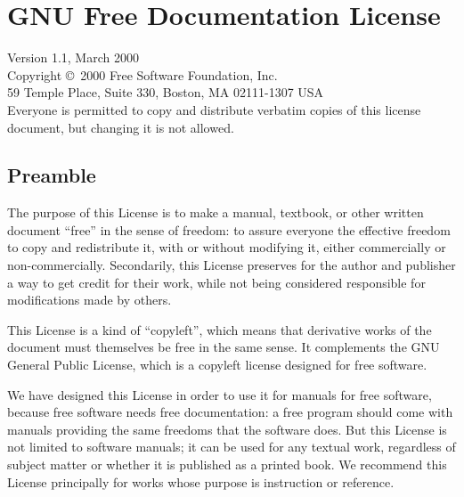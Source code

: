 \documentclass[12pt,twoside,openright,a4paper]{book}
\begin{document}
\chapter{GNU Free Documentation License}
\label{gfdl}



\begingroup
	\small

	Version 1.1, March 2000\\

	Copyright \copyright\ 2000  Free Software Foundation, Inc.\\
		59 Temple Place, Suite 330, Boston, MA  02111-1307  USA\\
	Everyone is permitted to copy and distribute verbatim copies
	of this license document, but changing it is not allowed.

	\section*{Preamble}

	The purpose of this License is to make a manual, textbook, or other
	written document ``free'' in the sense of freedom: to assure everyone
	the effective freedom to copy and redistribute it, with or without
	modifying it, either commercially or non-commercially.  Secondarily,
	this License preserves for the author and publisher a way to get
	credit for their work, while not being considered responsible for
	modifications made by others.

	This License is a kind of ``copyleft'', which means that derivative
	works of the document must themselves be free in the same sense.  It
	complements the GNU General Public License, which is a copyleft
	license designed for free software.

	We have designed this License in order to use it for manuals for free
	software, because free software needs free documentation: a free
	program should come with manuals providing the same freedoms that the
	software does.  But this License is not limited to software manuals;
	it can be used for any textual work, regardless of subject matter or
	whether it is published as a printed book.  We recommend this License
	principally for works whose purpose is instruction or reference.
\end{document}
